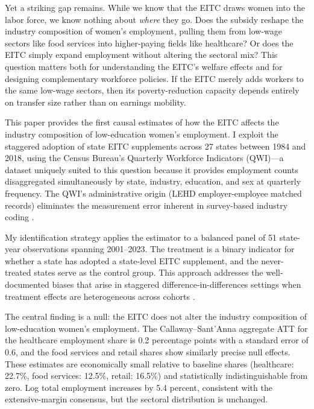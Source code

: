 \documentclass[12pt]{article}
\begin{document}
Yet a striking gap remains. While we know that the EITC draws women into the labor force, we know nothing about \textit{where} they go. Does the subsidy reshape the industry composition of women's employment, pulling them from low-wage sectors like food services into higher-paying fields like healthcare? Or does the EITC simply expand employment without altering the sectoral mix? This question matters both for understanding the EITC's welfare effects and for designing complementary workforce policies. If the EITC merely adds workers to the same low-wage sectors, then its poverty-reduction capacity depends entirely on transfer size rather than on earnings mobility.

This paper provides the first causal estimates of how the EITC affects the industry composition of low-education women's employment. I exploit the staggered adoption of state EITC supplements across 27 states between 1984 and 2018, using the Census Bureau's Quarterly Workforce Indicators (QWI)---a dataset uniquely suited to this question because it provides employment counts disaggregated simultaneously by state, industry, education, and sex at quarterly frequency. The QWI's administrative origin (LEHD employer-employee matched records) eliminates the measurement error inherent in survey-based industry coding \citep{abraham2013}.

My identification strategy applies the \citet{callaway2021} estimator to a balanced panel of 51 state-year observations spanning 2001--2023. The treatment is a binary indicator for whether a state has adopted a state-level EITC supplement, and the never-treated states serve as the control group. This approach addresses the well-documented biases that arise in staggered difference-in-differences settings when treatment effects are heterogeneous across cohorts \citep{goodman2021, dechaisemartin2020, sun2021, borusyak2024}.

The central finding is a null: the EITC does not alter the industry composition of low-education women's employment. The Callaway--Sant'Anna aggregate ATT for the healthcare employment share is 0.2 percentage points with a standard error of 0.6, and the food services and retail shares show similarly precise null effects. These estimates are economically small relative to baseline shares (healthcare: 22.7\%, food services: 12.5\%, retail: 16.5\%) and statistically indistinguishable from zero. Log total employment increases by 5.4 percent, consistent with the extensive-margin consensus, but the sectoral distribution is unchanged.
\end{document}

